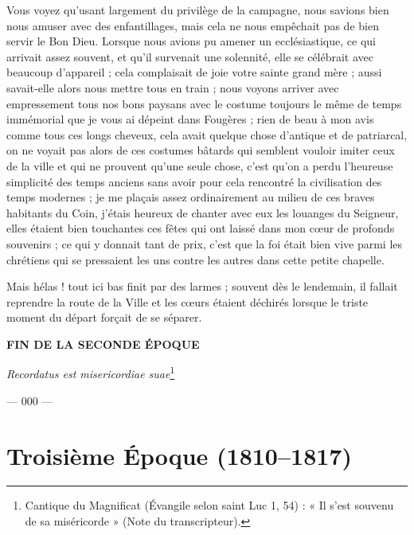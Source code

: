 \documentclass[11pt,a4paper]{report}
\begin{document}
Vous voyez qu'usant largement du privilège de la campagne, nous savions bien nous amuser avec des enfantillages, mais cela ne nous empêchait pas de bien servir le Bon Dieu. Lorsque nous avions pu amener un ecclésiastique, ce qui arrivait assez souvent, et qu'il survenait une solennité, elle se célébrait avec beaucoup d'appareil ; cela complaisait de joie votre sainte grand mère ; aussi savait-elle alors nous mettre tous en train ; nous voyons arriver avec empressement tous nos bons paysans avec le costume toujours le même de temps immémorial que je vous ai dépeint dans Fougères ; rien de beau à mon avis comme tous ces longs cheveux, cela avait quelque chose d'antique et de patriarcal, on ne voyait pas alors de ces costumes bâtards qui semblent vouloir imiter ceux de la ville et qui ne prouvent qu'une seule chose, c'est qu'on a perdu l'heureuse simplicité des temps anciens sans avoir pour cela rencontré la civilisation des temps modernes ; je me plaçais assez ordinairement au milieu de ces braves habitants du Coin, j'étais heureux de chanter avec eux les louanges du Seigneur, elles étaient bien touchantes ces fêtes qui ont laissé dans mon cœur de profonds souvenirs ; ce qui y donnait tant de prix, c'est que la foi était bien vive parmi les chrétiens qui se pressaient les uns contre les autres dans cette petite chapelle.

Mais hélas ! tout ici bas finit par des larmes ; souvent dès le lendemain, il fallait reprendre la route de la Ville et les cœurs étaient déchirés lorsque le triste moment du départ forçait de se séparer.

\vspace{1cm}

\begin{center}
\textbf{FIN DE LA SECONDE ÉPOQUE}

\vspace{0.5cm}

\textit{Recordatus est misericordiae suae}\footnote{Cantique du Magnificat (Évangile selon saint Luc 1, 54) : « Il s'est souvenu de sa miséricorde » (Note du transcripteur).}

\vspace{0.5cm}

--- 000 ---
\end{center}

\part*{Troisième Époque (1810--1817)}
\end{document}
